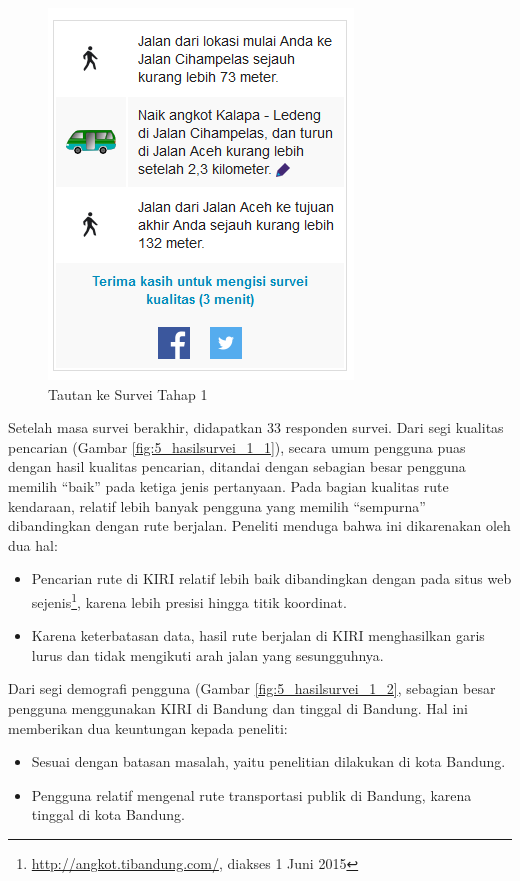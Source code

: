 \begin{figure}
	\centering
	\includegraphics[scale=0.75]{Gambar/5_survei_1}
	\caption{Tautan ke Survei Tahap 1} 
	\label{fig:5_survei_1}
\end{figure}

Setelah masa survei berakhir, didapatkan 33 responden survei. Dari segi kualitas pencarian (Gambar \ref{fig:5_hasilsurvei_1_1}), secara umum pengguna puas dengan hasil kualitas pencarian, ditandai dengan sebagian besar pengguna memilih ``baik'' pada ketiga jenis pertanyaan. Pada bagian kualitas rute kendaraan, relatif lebih banyak pengguna yang memilih ``sempurna'' dibandingkan dengan rute berjalan. Peneliti menduga bahwa ini dikarenakan oleh dua hal:

\begin{itemize}
	\item Pencarian rute di KIRI relatif lebih baik dibandingkan dengan pada situs web sejenis\footnote{\url{http://angkot.tibandung.com/}, diakses 1 Juni 2015}, karena lebih presisi hingga titik koordinat.
	\item Karena keterbatasan data, hasil rute berjalan di KIRI menghasilkan garis lurus dan tidak mengikuti arah jalan yang sesungguhnya.
\end{itemize}

Dari segi demografi pengguna (Gambar \ref{fig:5_hasilsurvei_1_2}, sebagian besar pengguna menggunakan KIRI di Bandung dan tinggal di Bandung. Hal ini memberikan dua keuntungan kepada peneliti:

\begin{itemize}
	\item Sesuai dengan batasan masalah, yaitu penelitian dilakukan di kota Bandung.
	\item Pengguna relatif mengenal rute transportasi publik di Bandung, karena tinggal di kota Bandung.
\end{itemize}

